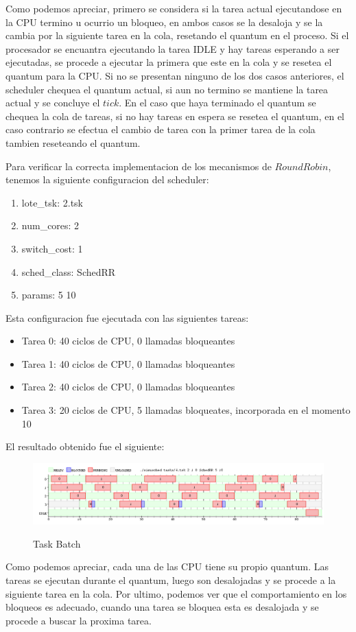 Como podemos apreciar, primero se considera si la tarea actual ejecutandose en la CPU termino u ocurrio un bloqueo, en ambos casos se la desaloja y se la cambia por la siguiente tarea en la cola, resetando el quantum en el proceso. Si el procesador se encuantra ejecutando la tarea IDLE y hay tareas esperando a ser ejecutadas, se procede a ejecutar la primera que este en la cola y se resetea el quantum para la CPU. Si no se presentan ninguno de los dos casos anteriores, el scheduler chequea el quantum actual, si aun no termino se mantiene la tarea actual y se concluye el $tick$. En el caso que haya terminado el quantum se chequea la cola de tareas, si no hay tareas en espera se resetea el quantum, en el caso contrario se efectua el cambio de tarea con la primer tarea de la cola tambien reseteando el quantum.

Para verificar la correcta implementacion de los mecanismos de $Round Robin$, tenemos la siguiente configuracion del scheduler:

\begin{enumerate}
	\item lote\_tsk: 2.tsk
	\item num\_cores: 2
	\item switch\_cost: 1
	\item sched\_class: SchedRR
	\item params: 5 10
\end{enumerate}

Esta configuracion fue ejecutada con las siguientes tareas:

\begin{itemize}
	\item Tarea 0: 40 ciclos de CPU, 0 llamadas bloqueantes
	\item Tarea 1: 40 ciclos de CPU, 0 llamadas bloqueantes
	\item Tarea 2: 40 ciclos de CPU, 0 llamadas bloqueantes
	\item Tarea 3: 20 ciclos de CPU, 5 llamadas bloqueates, incorporada en el momento 10
\end{itemize}

El resultado obtenido fue el siguiente:

\begin{figure}[h]
    \includegraphics[width=\linewidth]{images/4.png}
    \label{fig:Task Consola}
    \caption{Task Batch}
\end{figure}

Como podemos apreciar, cada una de las CPU tiene su propio quantum. Las tareas se ejecutan durante el quantum, luego son desalojadas y se procede a la siguiente tarea en la cola. Por ultimo, podemos ver que el comportamiento en los bloqueos es adecuado, cuando una tarea se bloquea esta es desalojada y se procede a buscar la proxima tarea.


